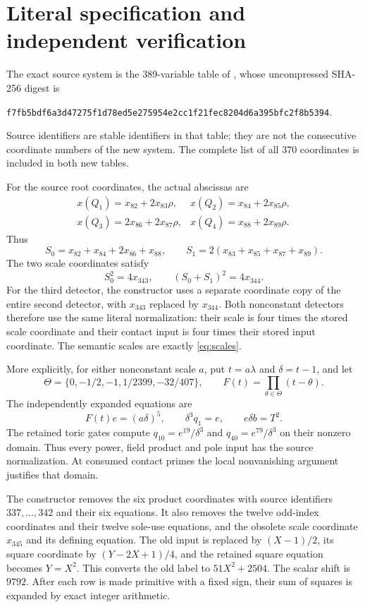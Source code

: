 \documentclass[11pt,a4paper]{article}
\theoremstyle{remark}\newtheorem{remark}[theorem]{Remark}
\begin{document}
\section{Literal specification and independent verification}

The exact source system is the 389-variable table of
\cite{Quartic389}, whose uncompressed SHA-256 digest is
\begin{center}\small
\nolinkurl{f7fb5bdf6a3d47275f1d78ed5e275954e2cc1f21fec8204d6a395bfc2f8b5394}.
\end{center}
Source identifiers are stable identifiers in that table;
they are not the consecutive coordinate numbers of the
new system. The complete list of all 370 coordinates is
included in both new tables.

For the source root coordinates, the actual abscissas are
\[
 \begin{array}{ll}
 x(Q_1)=x_{82}+2x_{83}\rho,&x(Q_2)=x_{84}+2x_{85}\rho,\\
 x(Q_3)=2x_{86}+2x_{87}\rho,&x(Q_4)=x_{88}+2x_{89}\rho.
 \end{array}
\]
Thus
\[
 S_0=x_{82}+x_{84}+2x_{86}+x_{88},\qquad
 S_1=2(x_{83}+x_{85}+x_{87}+x_{89}).
\]
The two scale coordinates satisfy
\[
                       S_0^2=4x_{343},\qquad
                       (S_0+S_1)^2=4x_{344}.
\]
For the third detector, the constructor uses a separate coordinate
copy of the entire second detector, with $x_{343}$ replaced by
$x_{344}$. Both nonconstant detectors therefore use the same
literal normalization: their scale is four times the stored
scale coordinate and their contact input is four times their
stored input coordinate. The semantic scales are exactly
\eqref{eq:scales}.

More explicitly, for either nonconstant scale $a$, put
$t=a\lambda$ and $\delta=t-1$, and let
\[
 \Theta=\{0,-1/2,-1,1/2399,-32/407\},\qquad
 F(t)=\prod_{\theta\in\Theta}(t-\theta).
\]
The independently expanded equations are
\[
 F(t)e=(a\delta)^5,\qquad \delta^3q_1=e,\qquad
 e\delta b=T^2.
\]
The retained toric gates compute
$q_{10}=e^{19}/\delta^3$ and $q_{40}=e^{79}/\delta^3$
on their nonzero domain. Thus every power, field product and
pole input has the source normalization. At consumed contact
primes the local nonvanishing argument justifies that domain.

The constructor removes the six product coordinates with
source identifiers $337,\ldots,342$ and their six equations.
It also removes the twelve odd-index coordinates and their
twelve sole-use equations, and the obsolete scale coordinate
$x_{345}$ and its defining equation. The old input is replaced by
$(X-1)/2$, its square coordinate by $(Y-2X+1)/4$, and the
retained square equation becomes $Y=X^2$. This converts
the old label to $51X^2+2504$. The scalar shift is $9792$.
After each row is made primitive with a fixed sign, their
sum of squares is expanded by exact integer arithmetic.
\end{document}
